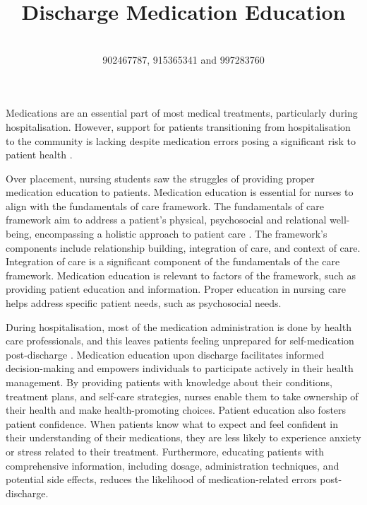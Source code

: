 \documentclass[british,12pt,a4paper]{article}
\title{{\fontsize{14}{15} \textbf{Discharge Medication Education}}}
\author{\vspace{-1em}{\fontsize{14}{15} Student ID's: 289955511, 326609248, 876923194,} \\ {\fontsize{14}{15}902467787, 915365341 and 997283760}}
\date{}
\begin{document}
\maketitle
\thispagestyle{fancy}
Medications are an essential part of most medical treatments, particularly during hospitalisation. However, support for patients transitioning from hospitalisation to the community is lacking despite medication errors posing a significant risk to patient health \parencite{Alqenae2020}.

Over placement, nursing students saw the struggles of providing proper medication education to patients. Medication education is essential for nurses to align with the fundamentals of care framework. The fundamentals of care framework aim to address a patient's physical, psychosocial and relational well-being, encompassing a holistic approach to patient care \parencite{Dempsey2013}. The framework's components include relationship building, integration of care, and context of care. Integration of care is a significant component of the fundamentals of the care framework. Medication education is relevant to factors of the framework, such as providing patient education and information. Proper education in nursing care helps address specific patient needs, such as psychosocial needs.

During hospitalisation, most of the medication administration is done by health care professionals, and this leaves patients feeling unprepared for self-medication post-discharge \parencite{Mortelmans2021}. Medication education upon discharge facilitates informed decision-making and empowers individuals to participate actively in their health management. By providing patients with knowledge about their conditions, treatment plans, and self-care strategies, nurses enable them to take ownership of their health and make health-promoting choices. Patient education also fosters patient confidence. When patients know what to expect and feel confident in their understanding of their medications, they are less likely to experience anxiety or stress related to their treatment. Furthermore, educating patients with comprehensive information, including dosage, administration techniques, and potential side effects, reduces the likelihood of medication-related errors post-discharge.
\end{document}
